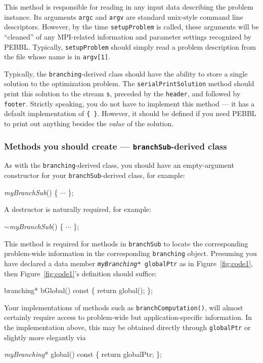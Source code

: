 This method is responsible for reading in any input data describing
the problem instance.  Its arguments \texttt{argc} and \texttt{argv}
are standard unix-style command line descriptors.  However, by the
time \texttt{setupProblem} is called, these arguments will be
``cleaned'' of any MPI-related information and parameter settings
recognized by PEBBL.  Typically, \texttt{setupProblem} should simply
read a problem description from the file whose name is in \texttt{argv[1]}.  

Typically, the \texttt{branching}-derived class should have the
ability to store a single solution to the optimization problem.  The
\texttt{serialPrintSolution} method should print this solution to the
stream \texttt{s}, preceded by the \texttt{header}, and followed by
\texttt{footer}.  Strictly speaking, you do not have to implement this
method --- it has a default implementation of \texttt{\{~\}}.
However, it should be defined if you need PEBBL to print
out anything besides the \emph{value} of the solution.

\subsubsection{Methods you should create ---
  \texttt{branchSub}-derived class}

As with the \texttt{branching}-derived class,
you should have an empty-argument constructor for your
\texttt{branchSub}-derived class, for example:
\begin{codeblock}
\emph{myBranchSub}() \{  $\cdots$ \}; \\
\end{codeblock}

A destructor is naturally required, for example:
\begin{codeblock}
$\sim$\emph{myBranchSub}() \{ $\cdots$ \}; \\
\end{codeblock}

This method is required for methods in \texttt{branchSub} to locate
the corresponding problem-wide information in the corresponding
\texttt{branching} object.  Presuming you have declared a data member
\texttt{\emph{myBranching}* globalPtr} as in Figure~\ref{fig:code1}, 
then Figure~\ref{fig:code1}'s definition should suffice:
\begin{codeblock}
branching* bGlobal() const \{ return global(); \};
\end{codeblock}
Your implementations of methods such as \texttt{branchComputation()},
will almost certainly require access to problem-wide but
application-specific information.  In the implementation above, this
may be obtained directly through \texttt{globalPtr} or slightly more
elegantly via
\begin{codeblock}
\emph{myBranching}* global() const \{ return globalPtr; \};
\end{codeblock}

